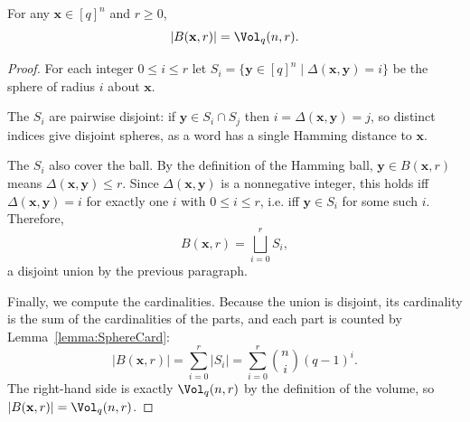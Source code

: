 \begin{lemma}
  \label{lemma:BallCard}
  \leanok
  For any $\mathbf{x} \in [q]^n$ and $r \geq 0$,
  \[|B(\mathbf{x}, r)| = \Vol_q(n, r).\]
\end{lemma}

\begin{proof}
  \leanok
  For each integer $0 \leq i \leq r$ let $S_i = \{\mathbf{y} \in [q]^n \mid \Delta(\mathbf{x}, \mathbf{y}) = i\}$
  be the sphere of radius $i$ about $\mathbf{x}$.

  The $S_i$ are pairwise disjoint: if $\mathbf{y} \in S_i \cap S_j$ then
  $i = \Delta(\mathbf{x}, \mathbf{y}) = j$, so distinct indices give disjoint spheres, as a word
  has a single Hamming distance to $\mathbf{x}$.

  The $S_i$ also cover the ball. By the definition of the Hamming ball,
  $\mathbf{y} \in B(\mathbf{x}, r)$ means $\Delta(\mathbf{x}, \mathbf{y}) \leq r$. Since
  $\Delta(\mathbf{x}, \mathbf{y})$ is a nonnegative integer, this holds iff
  $\Delta(\mathbf{x}, \mathbf{y}) = i$ for exactly one $i$ with $0 \leq i \leq r$, i.e. iff
  $\mathbf{y} \in S_i$ for some such $i$. Therefore,
  \[
    B(\mathbf{x}, r) = \bigsqcup_{i=0}^{r} S_i,
  \]
  a disjoint union by the previous paragraph.

  Finally, we compute the cardinalities. Because the union is disjoint, its cardinality is the sum of the
  cardinalities of the parts, and each part is counted by Lemma~\ref{lemma:SphereCard}:
  \[
    |B(\mathbf{x}, r)|
      = \sum_{i=0}^{r} |S_i|
      = \sum_{i=0}^{r} \binom{n}{i}(q-1)^i.
  \]
  The right-hand side is exactly $\Vol_q(n, r)$ by the definition of the volume, so
  $|B(\mathbf{x}, r)| = \Vol_q(n, r)$.
\end{proof}

